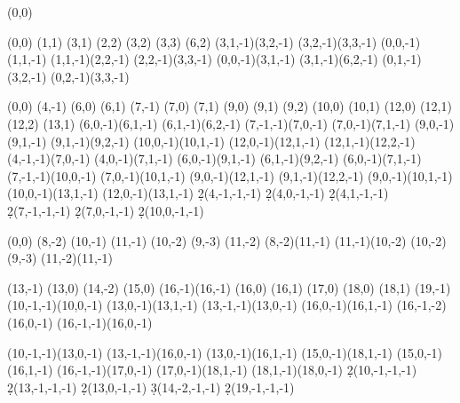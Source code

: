 \documentclass{spectralsequence-example}
\begin{document}
\NewSseqGroup\tower {} {%
    \class(0,0)
}

\NewSseqGroup\towergroup {} {%
    \tower(0,0)
    \class(1,1)
    \class(3,1)
    \class(2,2)
    \class(3,2)
    \class(3,3)
    \class(6,2)
    \structline(3,1,-1)(3,2,-1)
    \structline(3,2,-1)(3,3,-1)
    \structline(0,0,-1)(1,1,-1)
    \structline(1,1,-1)(2,2,-1)
    \structline(2,2,-1)(3,3,-1)
    \structline(0,0,-1)(3,1,-1)
    \structline(3,1,-1)(6,2,-1)
    \structline(0,1,-1)(3,2,-1)
    \structline(0,2,-1)(3,3,-1)
}


\NewSseqGroup\towergroupa {} {%
    \towergroup(0,0)
    \tower(4,-1)
%
    \class(6,0)
    \class(6,1)
    \class(7,-1)
    \class(7,0)
    \class(7,1)
    \class(9,0)
    \class(9,1)
    \class(9,2)
    \class(10,0)
    \class(10,1)
    \class(12,0)
    \class(12,1)
    \class(12,2)
    \class(13,1)
    \structline(6,0,-1)(6,1,-1)
    \structline(6,1,-1)(6,2,-1)
    \structline(7,-1,-1)(7,0,-1)
    \structline(7,0,-1)(7,1,-1)
    \structline(9,0,-1)(9,1,-1)
    \structline(9,1,-1)(9,2,-1)
    \structline(10,0,-1)(10,1,-1)
    \structline(12,0,-1)(12,1,-1)
    \structline(12,1,-1)(12,2,-1)
%
    \structline(4,-1,-1)(7,0,-1)
    \structline(4,0,-1)(7,1,-1)
    \structline(6,0,-1)(9,1,-1)
    \structline(6,1,-1)(9,2,-1)
    \structline(6,0,-1)(7,1,-1)
    \structline(7,-1,-1)(10,0,-1)
    \structline(7,0,-1)(10,1,-1)
    \structline(9,0,-1)(12,1,-1)
    \structline(9,1,-1)(12,2,-1)
    \structline(9,0,-1)(10,1,-1)
    \structline(10,0,-1)(13,1,-1)
    \structline(12,0,-1)(13,1,-1)
%
    \d2(4,-1,-1,-1)
    \d2(4,0,-1,-1)
    \d2(4,1,-1,-1)
    \d2(7,-1,-1,-1)
    \d2(7,0,-1,-1)
    \d2(10,0,-1,-1)
}

\NewSseqGroup\towergroupb {} {%
    \towergroupa(0,0)
    \tower(8,-2)
    \class(10,-1)
    \class(11,-1)
    \class(10,-2)
    \class(9,-3)
    \class(11,-2)
    \structline(8,-2)(11,-1)
    \structline(11,-1)(10,-2)
    \structline(10,-2)(9,-3)
    \structline(11,-2)(11,-1)

    \class(13,-1)
    \class(13,0)
    \class(14,-2)
    \class(15,0)
    \class(16,-1)\class(16,-1)
    \class(16,0)
    \class(16,1)
    \class(17,0)
    \class(18,0)
    \class(18,1)
    \class(19,-1)
    \structline(10,-1,-1)(10,0,-1)
    \structline(13,0,-1)(13,1,-1)
    \structline(13,-1,-1)(13,0,-1)
    \structline(16,0,-1)(16,1,-1)
    \structline(16,-1,-2)(16,0,-1)
    \structline(16,-1,-1)(16,0,-1)

    \structline(10,-1,-1)(13,0,-1)
    \structline(13,-1,-1)(16,0,-1)
    \structline(13,0,-1)(16,1,-1)
    \structline(15,0,-1)(18,1,-1)
    \structline(15,0,-1)(16,1,-1)
    \structline(16,-1,-1)(17,0,-1)
    \structline(17,0,-1)(18,1,-1)
    \structline(18,1,-1)(18,0,-1)
    \d2(10,-1,-1,-1)
    \d2(13,-1,-1,-1)
    \d2(13,0,-1,-1)
    \d3(14,-2,-1,-1)
    \d2(19,-1,-1,-1)
}
\end{document}
